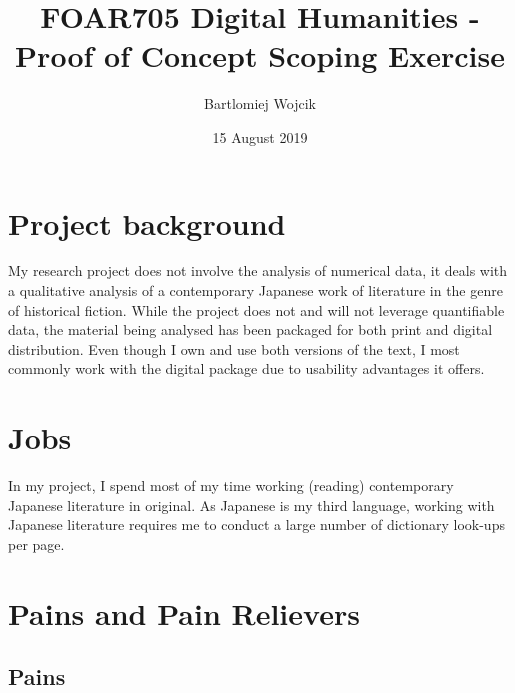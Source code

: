 \documentclass{article}
\title{FOAR705 Digital Humanities - Proof of Concept Scoping Exercise}
\author{Bartlomiej Wojcik}
\date{15 August 2019}
\begin{document}
\maketitle

\section{Project background}
My research project does not involve the analysis of numerical data, it deals with a qualitative analysis of a contemporary Japanese work of literature in the genre of historical fiction. While the project does not and will not leverage quantifiable data, the material being analysed has been packaged for both print and digital distribution. Even though I own and use both versions of the text, I most commonly work with the digital package due to usability advantages it offers. 

\section{Jobs}
In my project, I spend most of my time working (reading) contemporary Japanese literature in original. As Japanese is my third language, working with Japanese literature requires me to conduct
a large number of dictionary look-ups per page.
\section{Pains and Pain Relievers}
\subsection{Pains}
\end{document}
